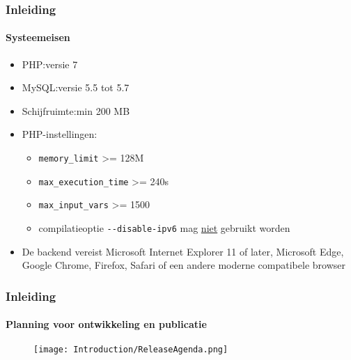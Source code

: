 \begin{frame}[fragile]
	\frametitle{Inleiding}
	\framesubtitle{Systeemeisen}

	\begin{itemize}
		\item PHP:\tabto{2.2cm}versie 7
		\item MySQL:\tabto{2.2cm}versie 5.5 tot 5.7
		\item Schijfruimte:\tabto{2.2cm}min 200 MB
		\item PHP-instellingen:

			\begin{itemize}
				\item \texttt{memory\_limit} >= 128M
				\item \texttt{max\_execution\_time} >= 240s
				\item \texttt{max\_input\_vars} >= 1500
				\item compilatieoptie \texttt{-}\texttt{-disable-ipv6} mag \underline{niet} gebruikt worden
			\end{itemize}

		\item De backend vereist Microsoft Internet Explorer 11 of later,
			Microsoft Edge, Google Chrome, Firefox, Safari of een andere moderne
			compatibele browser

	\end{itemize}

\end{frame}

\begin{frame}[fragile]
	\frametitle{Inleiding}
	\framesubtitle{Planning voor ontwikkeling en publicatie}

	\begin{figure}
		\texttt{[image: Introduction/ReleaseAgenda.png]}
	\end{figure}

\end{frame}

